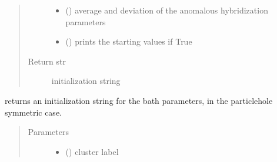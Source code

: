 \documentclass[letterpaper,10pt,english]{sphinxmanual}
\begin{document}
\begin{fulllineitems}
\begin{fulllineitems}
\begin{quote}
\begin{description}
\begin{itemize}
\item {} 
\sphinxAtStartPar
{} (\sphinxstyleliteralemphasis{\sphinxupquote{(}}\sphinxstyleliteralemphasis{\sphinxupquote{,}}\sphinxstyleliteralemphasis{\sphinxupquote{)}}) \textendash{} average and deviation of the anomalous hybridization parameters

\item {} 
\sphinxAtStartPar
{} () \textendash{} prints the starting values if True

\end{itemize}

\item[{Return str}] \leavevmode
\sphinxAtStartPar
initialization string

\end{description}\end{quote}

\end{fulllineitems}


\begin{fulllineitems}
\label{\detokenize{cdmft:pyqcm.cdmft.general_bath.starting_values_PH}}
\sphinxAtStartPar
returns an initialization string for the bath parameters, in the particle\sphinxhyphen{}hole symmetric case.
\begin{quote}\begin{description}
\item[{Parameters}] \leavevmode\begin{itemize}
\item {} 
\sphinxAtStartPar
{} () \textendash{} cluster label


\end{itemize}
\end{description}
\end{quote}
\end{fulllineitems}
\end{fulllineitems}
\end{document}
